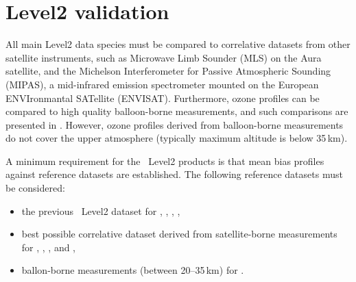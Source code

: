 \section{Level2 validation}

All main Level2 data species must be compared to correlative datasets
from other satellite instruments, such as Microwave Limb Sounder (MLS)
on the Aura satellite, and the Michelson Interferometer for Passive
Atmospheric Sounding (MIPAS), a mid-infrared emission spectrometer
mounted on the European ENVIronmantal SATellite (ENVISAT).
Furthermore, \smr ozone profiles can be compared to high quality balloon-borne 
measurements, and such comparisons are presented in \citep{jegou:techn:08}.
However, ozone profiles derived from balloon-borne 
measurements do not cover the upper atmosphere (typically maximum
altitude is below 35\,km).

A minimum requirement for the \smr\ Level2 products is that mean bias
profiles against reference datasets are established. 
The following reference datasets must be considered:
\begin{itemize}

\item the previous \smr\ Level2 dataset for , , , ,

\item best possible correlative dataset derived from satellite-borne measurements
      for , , , and ,

\item ballon-borne measurements (between 20--35\,km) for .

\end{itemize}



 
